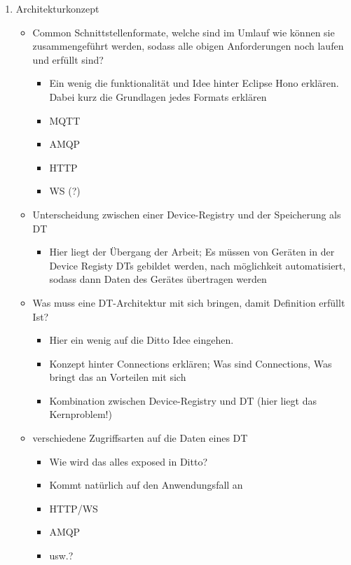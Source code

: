 \begin{enumerate}
    \item Architekturkonzept
    \begin{itemize}
        \item Common Schnittstellenformate, welche sind im Umlauf wie können sie zusammengeführt werden, sodass alle obigen Anforderungen noch laufen und erfüllt sind?
        \begin{itemize}
            \item Ein wenig die funktionalität und Idee hinter Eclipse Hono erklären. Dabei kurz die Grundlagen jedes Formats erklären
            \item MQTT
            \item AMQP
            \item HTTP
            \item WS (?)
        \end{itemize}
        \item Unterscheidung zwischen einer Device-Registry und der Speicherung als DT
        \begin{itemize}
            \item Hier liegt der Übergang der Arbeit; Es müssen von Geräten in der Device Registy DTs gebildet werden, nach möglichkeit automatisiert, sodass dann Daten des Gerätes übertragen werden
        \end{itemize}
        \item Was muss eine DT-Architektur mit sich bringen, damit Definition erfüllt Ist?
        \begin{itemize}
            \item Hier ein wenig auf die Ditto Idee eingehen.
            \item Konzept hinter Connections erklären; Was sind Connections, Was bringt das an Vorteilen mit sich
            \item Kombination zwischen Device-Registry und DT (hier liegt das Kernproblem!)
        \end{itemize}
        \item verschiedene Zugriffsarten auf die Daten eines DT
        \begin{itemize}
            \item Wie wird das alles exposed in Ditto?
            \item Kommt natürlich auf den Anwendungsfall an
            \item HTTP/WS
            \item AMQP
            \item usw.?

\end{itemize}
\end{itemize}
\end{enumerate}
